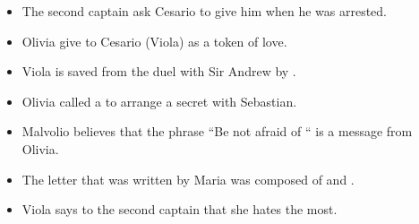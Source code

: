 \documentclass[12pt, a4paper]{article}
\begin{document}
\begin{itemize}

\item[\ding{113}] The second captain ask Cesario to give him  when he was arrested.

\item[\ding{113}] Olivia give  to Cesario (Viola) as a token of love.

\item[\ding{113}] Viola is saved from the duel with Sir Andrew by .

\item[\ding{113}] Olivia called a  to arrange a secret  with Sebastian.

\item[\ding{113}] Malvolio believes that the phrase “Be not afraid of “ is a message from Olivia.  

\item[\ding{113}] The letter that was written by Maria was composed of  and .

\item[\ding{113}] Viola says to the second captain that she hates  the most.

\end{itemize}
\end{document}
